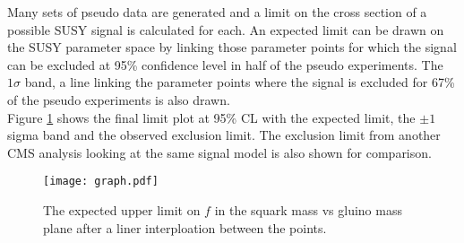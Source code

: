Many sets of pseudo data are generated and a limit on the cross section of a 
possible SUSY signal is calculated for each. An expected limit can be drawn on 
the SUSY parameter space by linking those parameter points for which the signal 
can be excluded at 95\% confidence level in half of the pseudo experiments. The 
$1 \sigma$ band, a line linking the parameter points where the signal is 
excluded for 67\% of the pseudo experiments is also drawn. \\

Figure \ref{fig:finallimit} shows the final limit plot at 95\% CL with the
expected limit, the $\pm1$ sigma band and the observed exclusion limit. The
exclusion limit from another CMS analysis \cite{ra3} looking at the same signal 
model is also shown for comparison.

\begin{figure}
\begin{center}
\texttt{[image: graph.pdf]}
\end{center}
\caption{The expected upper limit on $f$ in the squark mass vs gluino mass plane 
after a liner interploation between the points. }
\label{fig:finallimit}
\end{figure}
